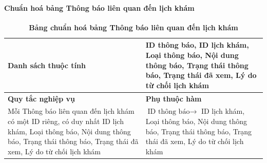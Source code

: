 \paragraph{Chuẩn hoá bảng Thông báo liên quan đến lịch khám}
\mbox{}
\begin{table}[H]
	\caption{\bfseries \fontsize{12pt}{0pt}\selectfont Bảng chuẩn hoá bảng Thông báo liên quan đến lịch khám}
	\centering
	\begin{tabularx}{0.9\textwidth}{|X|X|}
		\hline
		\textbf{Danh sách thuộc tính} & ID thông báo, ID lịch khám, Loại thông báo, Nội dung thông báo, Trạng thái thông báo, Trạng thái đã xem, Lý do từ chối lịch khám                                             \\
		\hline
		\textbf{Quy tắc nghiệp vụ}    & \textbf{Phụ thuộc hàm}                                                                                                                                                       \\
		\hline
		Mỗi Thông báo liên quan đến lịch khám có một ID riêng, có duy nhất ID lịch khám, Loại thông báo, Nội dung thông báo, Trạng thái thông báo, Trạng thái đã xem, Lý do từ chối lịch khám
		                              & \parbox[t]{\linewidth}{$\text{ID thông báo} \rightarrow$ ID lịch khám, Loại thông báo, Nội dung thông báo, Trạng thái thông báo, Trạng thái đã xem, Lý do từ chối lịch khám} \\
		\hline
		                                                                                                                                \\
		                                                                                                                   \\
		\hline
	\end{tabularx}
\end{table}

